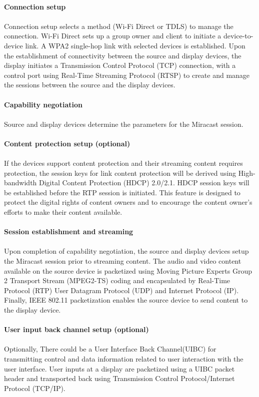 \\
\textbf{Connection setup} \\
\\
Connection setup selects a method (Wi-Fi Direct or TDLS) to manage the connection. Wi-Fi Direct sets up a group owner and client to initiate a device-to-device link. A WPA2 single-hop link with selected devices is established. Upon the establishment of connectivity between the source and display devices, the display initiates a Transmission Control Protocol (TCP) connection, with a control port using Real-Time Streaming Protocol (RTSP) to create and manage the sessions between the source and the display devices. \\ 
\\
\textbf{Capability negotiation} \\
\\
Source and display devices determine the parameters for the Miracast session. \\ 
\\  
\textbf{Content protection setup (optional)}\\
\\
If the devices support content protection and their streaming content requires
protection, the session keys for link content protection will be derived using High-bandwidth Digital Content Protection (HDCP) 2.0/2.1. HDCP session keys will be established before the RTP session is initiated. This feature is designed to protect the digital rights of content owners and to encourage the content owner's efforts to make their content available. \\
\\
\textbf{Session establishment and streaming} \\
\\
Upon completion of capability negotiation, the source and display devices setup the Miracast session prior to streaming content. The audio and video content available on the source device is packetized 
using Moving Picture Experts Group 2 Transport Stream (MPEG2-TS) coding and encapsulated by Real-Time Protocol (RTP) User Datagram Protocol (UDP) and Internet Protocol (IP). Finally, IEEE 802.11 packetization enables the source device to send content to the display device. \\
\\
\textbf{User input back channel setup (optional)}\\
\\
Optionally, There could be a User Interface Back Channel(UIBC) for transmitting control and data information related to user interaction with the user interface. User inputs at a display are packetized using a UIBC packet header and transported back using Transmission Control Protocol/Internet Protocol (TCP/IP).\\

